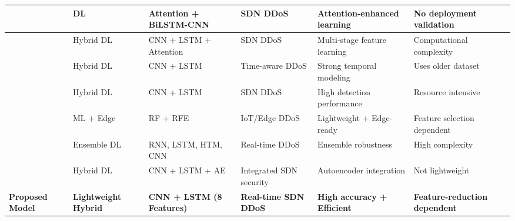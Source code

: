 \documentclass[ASNA,twocolumn]{USG} %
\begin{document}
\begin{table}[htb!]
\begin{tabular}{|p{1.5cm}|p{1.5cm}|p{3.2cm}|p{2.2cm}|p{2.9cm}|p{2.9cm}|}
\cite{priyadarshini2023sdn} & DL & Attention + BiLSTM-CNN & SDN DDoS & Attention-enhanced learning & No deployment validation \\
\hline

\cite{shaheed2024hybrid} & Hybrid DL & CNN + LSTM + Attention & SDN DDoS & Multi-stage feature learning & Computational complexity \\
\hline

\cite{habib2024time} & Hybrid DL & CNN + LSTM & Time-aware DDoS & Strong temporal modeling & Uses older dataset \\
\hline

\cite{xu2025deep} & Hybrid DL & CNN + LSTM & SDN DDoS & High detection performance & Resource intensive \\
\hline

\cite{ain2025securing} & ML + Edge & RF + RFE & IoT/Edge DDoS & Lightweight + Edge-ready & Feature selection dependent \\
\hline

\cite{ma2023real} & Ensemble DL & RNN, LSTM, HTM, CNN & Real-time DDoS & Ensemble robustness & High complexity \\
\hline

\cite{songa2024integrated} & Hybrid DL & CNN + LSTM + AE & Integrated SDN security & Autoencoder integration & Not lightweight \\
\hline

\rowcolor{gray!20}
\textbf{Proposed Model} & \textbf{Lightweight Hybrid} & \textbf{CNN + LSTM (8 Features)} & \textbf{Real-time SDN DDoS} & \textbf{High accuracy + Efficient} & \textbf{Feature-reduction dependent} \\
\hline

\end{tabular}
\end{table}   
\end{document}
